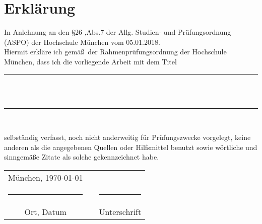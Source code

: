 \thispagestyle{plain}
\section*{Erkl\"arung} 
In Anlehnung an den \S26 ,Abs.7 der Allg. Studien- und Pr\"ufungsordnung (ASPO) der Hochschule M\"unchen vom 05.01.2018. \\
Hiermit erkl\"are ich gem\"a\ss \ der Rahmenpr\"ufungsordnung der Hochschule M\"unchen, dass ich die vorliegende Arbeit mit dem Titel 
\begin{center}
\rule{16cm}{0.4pt}\\
\vspace{2mm}
\inserttitle \\
\rule{16cm}{0.4pt}\\
\vspace{2mm}
\end{center}
selbst\"andig verfasst, noch nicht anderweitig f\"ur Pr\"ufungszwecke vorgelegt, keine anderen als die angegebenen Quellen oder Hilfsmittel benutzt sowie w\"ortliche und sinngem\"a\ss e Zitate als solche gekennzeichnet habe.

\begin{center}

\vspace{2cm}
\hspace{1cm}
\begin{tabular}{ccc}
\vspace{-0.3cm}M\"unchen, \today	&\hspace{2cm} 		& \\
\rule{6cm}{0.8pt}					&					&\rule{6cm}{0.8pt}\\
Ort, Datum							&					& Unterschrift			
\end{tabular}
\end{center}
           		


\begin{comment}
\vspace{2cm}
Diese Arbeit ist unter der Lizenz Creative Commons Attribution 3.0 Germany verf\"ugbar. Eine Kopie der Lizenz kann unter http://creativecommons.org/licenses/by/3.0/de eingesehen oder durch einen Brief an Creative Commons, 171 Second Street, Suite 300, San Francisco, California 94105, USA erfragt werden.

\begin{center}
\vspace{2cm}

\hspace{1cm}\begin{tabular}{ccc}
\vspace{-0.3cm}M\"unchen, \today	&\hspace{2cm} 		& \\
\rule{6cm}{0.8pt}					&					&\rule{6cm}{0.8pt}\\
Ort, Datum							&					& Unterschrift			
\end{tabular}
\end{center}
\end{comment}